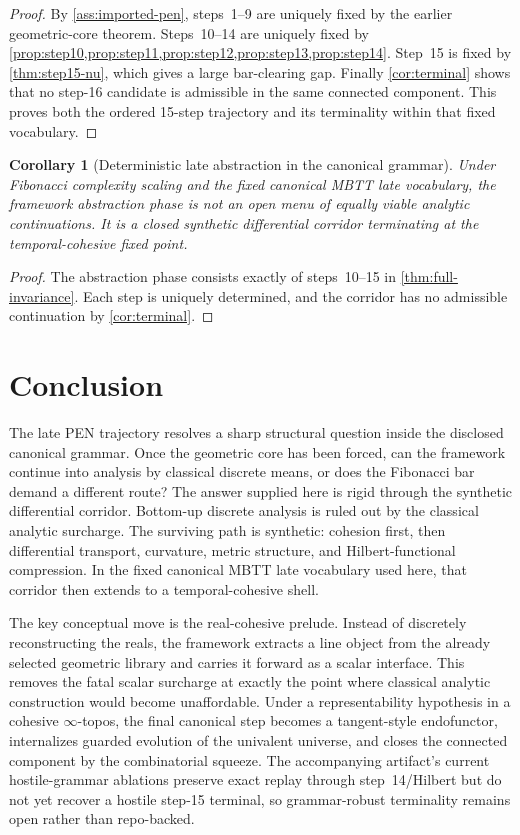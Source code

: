 \documentclass[11pt]{article}
\theoremstyle{plain}
\newtheorem{corollary}[theorem]{Corollary}
\theoremstyle{definition}
\theoremstyle{remark}
\begin{document}
\begin{proof}
By \cref{ass:imported-pen}, steps~1--9 are uniquely fixed by the earlier geometric-core theorem. Steps~10--14 are uniquely fixed by \cref{prop:step10,prop:step11,prop:step12,prop:step13,prop:step14}. Step~15 is fixed by \cref{thm:step15-nu}, which gives a large bar-clearing gap. Finally \cref{cor:terminal} shows that no step-16 candidate is admissible in the same connected component. This proves both the ordered 15-step trajectory and its terminality within that fixed vocabulary.
\end{proof}

\begin{corollary}[Deterministic late abstraction in the canonical grammar]
\label{cor:deterministic-late}
Under Fibonacci complexity scaling and the fixed canonical MBTT late vocabulary, the framework abstraction phase is not an open menu of equally viable analytic continuations. It is a closed synthetic differential corridor terminating at the temporal-cohesive fixed point.
\end{corollary}

\begin{proof}
The abstraction phase consists exactly of steps~10--15 in \cref{thm:full-invariance}. Each step is uniquely determined, and the corridor has no admissible continuation by \cref{cor:terminal}.
\end{proof}

\section{Conclusion}

The late PEN trajectory resolves a sharp structural question inside the disclosed canonical grammar. Once the geometric core has been forced, can the framework continue into analysis by classical discrete means, or does the Fibonacci bar demand a different route? The answer supplied here is rigid through the synthetic differential corridor. Bottom-up discrete analysis is ruled out by the classical analytic surcharge. The surviving path is synthetic: cohesion first, then differential transport, curvature, metric structure, and Hilbert-functional compression. In the fixed canonical MBTT late vocabulary used here, that corridor then extends to a temporal-cohesive shell.

The key conceptual move is the real-cohesive prelude. Instead of discretely reconstructing the reals, the framework extracts a line object from the already selected geometric library and carries it forward as a scalar interface. This removes the fatal scalar surcharge at exactly the point where classical analytic construction would become unaffordable. Under a representability hypothesis in a cohesive $\infty$-topos, the final canonical step becomes a tangent-style endofunctor, internalizes guarded evolution of the univalent universe, and closes the connected component by the combinatorial squeeze. The accompanying artifact's current hostile-grammar ablations preserve exact replay through step~14/Hilbert but do not yet recover a hostile step-15 terminal, so grammar-robust terminality remains open rather than repo-backed.
\end{document}
